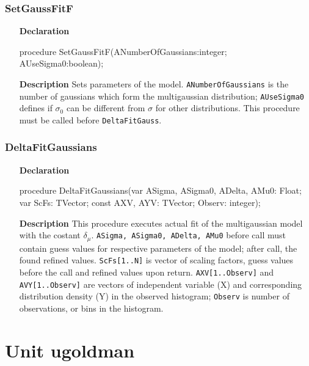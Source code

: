 \documentclass[12pt,a4paper,oneside]{report}
\newcommand{\lmath}[1]{   %
	\marginpar{\vspace{#1} 
		\begin{flushright}
			LMath
	\end{flushright} }
}
\newcommand{\declarationitem}[1]{\textbf{#1}}
\newcommand{\descriptiontitle}[1]{\textbf{#1}}
\newcommand{\code}[1]{\texttt{#1}}
\begin{document}
\subsubsection{SetGaussFitF}
\label{ugaussf-SetGaussFitF}
\begin{itemize}\item[\declarationitem{Declaration}\hfill]
	\begin{flushleft}
		\begin{ttfamily}
			procedure SetGaussFitF(ANumberOfGaussians:integer; AUseSigma0:boolean);\end{ttfamily}
	\end{flushleft}
	\item[\descriptiontitle{Description}]
	Sets parameters of the model. \code{ANumberOfGaussians} is the number of gaussians which form the multigaussian distribution; \code{AUseSigma0} defines if $\sigma_0$ can be different from $\sigma$ for other distributions. This procedure must be called before \code{DeltaFitGauss}.
\end{itemize}
\subsubsection{DeltaFitGaussians}
\label{ugaussf-DeltaFitGaussians}
\begin{itemize}\item[\declarationitem{Declaration}\hfill]
	\begin{flushleft}
		\begin{ttfamily}
			procedure DeltaFitGaussians(var ASigma, ASigma0, ADelta, AMu0: Float; var ScFs: TVector; const AXV, AYV: TVector; Observ: integer);\end{ttfamily}
	\end{flushleft}
	\item[\descriptiontitle{Description}]
	This procedure executes actual fit of the multigaussian model with the costant $\delta_{\mu}$. \code{ASigma, ASigma0, ADelta, AMu0} before call must contain guess values for respective parameters of the model; after call, the found refined values. \code{ScFs[1..N]} is vector of scaling factors, guess values before the call and refined values upon return. \code{AXV[1..Observ]} and \code{AVY[1..Observ]} are vectors of independent variable (X) and corresponding distribution density (Y) in the observed histogram; \code{Observ} is number of observations, or bins in the histogram.
\end{itemize}
\section{Unit ugoldman}\lmath{-24pt}
\label{ugoldman}
\end{document}
